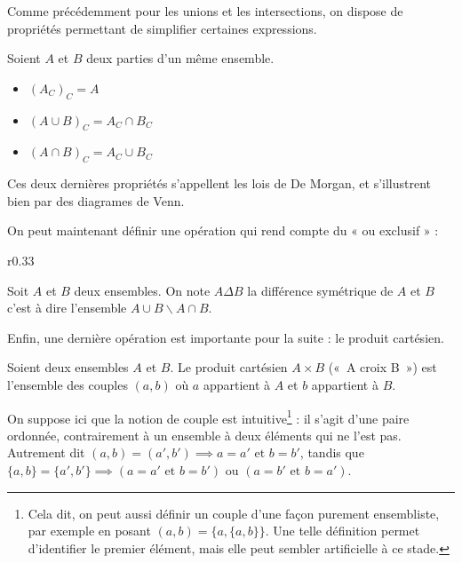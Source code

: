 \medskip
Comme précédemment pour les unions et les intersections, on dispose de propriétés permettant de simplifier certaines expressions.

\begin{prop}
    Soient $A$ et $B$ deux parties d'un même ensemble.
\begin{itemize}
    \item $(A_C)_C=A$
    \item $(A\cup B)_C= A_C \cap B_C$
    \item $(A\cap B)_C= A_C \cup B_C$
\end{itemize}    
\end{prop}

Ces deux dernières propriétés s'appellent les lois de De Morgan, et s'illustrent bien par des diagrames de Venn.

\medskip
{}


\medskip
On peut maintenant définir une opération qui rend compte du « ou exclusif » :
\begin{wrapfigure}[2]{r}{0.33\textwidth}
    \vspace{-0.5em}
\end{wrapfigure}

\vspace{-1em}
\begin{defini}
    Soit $A$ et $B$ deux ensembles. On note $A\Delta B$ la différence symétrique de $A$ et $B$ c'est à dire l'ensemble $A\cup B \backslash A\cap B$.
\end{defini}

Enfin, une dernière opération est importante pour la suite : le produit cartésien. 

\begin{defini}
Soient deux ensembles $A$ et $B$. Le produit cartésien $A\times B$ («~A croix B~») est l'ensemble des couples $(a,b)$ où $a$ appartient à $A$ et $b$ appartient à $B$.
\end{defini}

On suppose ici que la notion de couple est intuitive\footnote{Cela dit, on peut aussi définir un couple d'une façon purement ensembliste, par exemple en posant $(a,b)=\{a, \{a, b\}\}$. Une telle définition permet d'identifier le premier élément, mais elle peut sembler artificielle à ce stade.} : il s'agit d'une paire ordonnée, contrairement à un ensemble à deux éléments qui ne l'est pas. Autrement dit $(a,b)=(a',b')\implies a=a' \text{ et } b=b'$, tandis que $\{a,b\}=\{a',b'\}\implies (a=a' \text{ et } b=b') \text{ ou } (a=b' \text{ et } b=a')$. 

